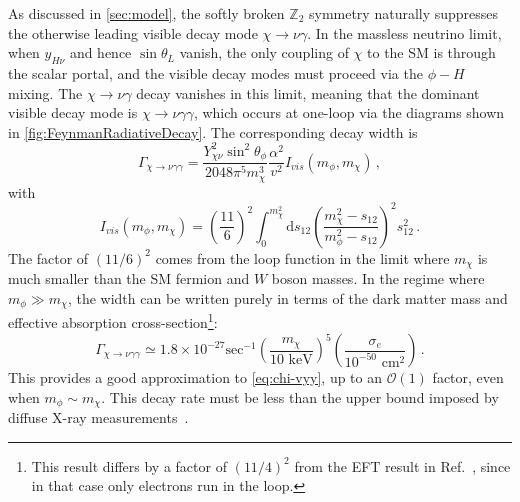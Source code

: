 \documentclass[aps, prd, reprint, nofootinbib, amsmath, amssymb, floatfix]{revtex4-2}
\begin{document}
\begin{figure*}
{
}
\caption{Feynman diagrams for the $\chi\to\nu\gamma\gamma$ decay at one-loop, where $f$ denotes charged SM fermions.}
    \label{fig:FeynmanRadiativeDecay}
\end{figure*}

As discussed in \cref{sec:model}, the softly broken $\mathbb{Z}_2$ symmetry naturally suppresses the otherwise leading visible decay mode $\chi\to\nu\gamma$. In the massless neutrino limit, when $y_{H\nu}$ and hence $\sin\theta_L$ vanish, the only coupling of $\chi$ to the SM is through the scalar portal, and the visible decay modes must proceed via the $\phi-H$ mixing. The $\chi\to\nu\gamma$ decay vanishes in this limit, meaning that the dominant visible decay mode is $\chi\to\nu\gamma\gamma$, which occurs at one-loop via the diagrams shown in \cref{fig:FeynmanRadiativeDecay}. The corresponding decay width is
%
\begin{equation} \label{eq:chi-vyy}
    \Gamma_{\chi\to\nu\gamma\gamma} = \frac{Y_{\chi\nu}^2\sin^2\theta_\phi}{2048 \pi^5 m_\chi^3}\frac{\alpha^2}{v^2} I_{vis}(m_\phi,m_\chi) \,,
\end{equation}
%
with
%
\begin{equation}
    I_{vis}(m_\phi,m_
    \chi) = \left(\frac{11}{6}\right)^2 \int_0^{m_\chi^2} \text{d}s_{12}\left(\frac{m_\chi^2 - s_{12}}{m_\phi^2 - s_{12}}\right)^2 s_{12}^2 \,.
\end{equation}
%
The factor of $(11/6)^2$ comes from the loop function in the limit where $m_\chi$ is much smaller than the SM fermion and $W$ boson masses. In the regime where $m_\phi \gg m_\chi$, the width can be written purely in terms of the dark matter mass and effective absorption cross-section\footnote{This result differs by a factor of $(11/4)^2$ from the EFT result in Ref.~\cite{Ge:2022ius}, since in that case only electrons run in the loop.}: 
%
\begin{equation}
    \Gamma_{\chi\to\nu\gamma\gamma} \simeq 1.8 \times 10^{-27} \text{sec}^{-1} \left(\frac{m_\chi}{10\text{ keV}}\right)^5 \left(\frac{\sigma_e}{10^{-50}\text{ cm}^2}\right) \,.
\end{equation}
%
This provides a good approximation to \cref{eq:chi-vyy}, up to an $\mathcal{O}(1)$ factor, even when $m_\phi \sim m_\chi$. This decay rate must be less than the upper bound imposed by diffuse X-ray measurements~\cite{Essig:2013goa}. 
\end{document}
